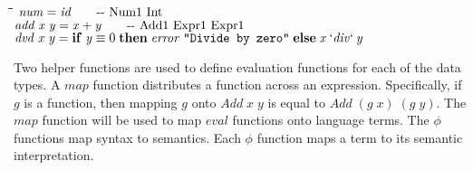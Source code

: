 \documentclass[10pt]{article}
\newlength{\lwidth}\setlength{\lwidth}{4.5cm}
\newlength{\cwidth}\setlength{\cwidth}{8mm} %
\newcommand{\Conid}[1]{\mathit{#1}}
\newcommand{\Varid}[1]{\mathit{#1}}
\begin{document}
\begin{tabbing}
\qquad\=\hspace{\lwidth}\=\hspace{\cwidth}\=\+\kill
${\Varid{num}\mathrel{=}\Varid{id}\mbox{\qquad-{}-  Num1 Int}}$\\
${\Varid{add}\;\Varid{x}\;\Varid{y}\mathrel{=}\Varid{x}\mathbin{+}\Varid{y}\mbox{\qquad-{}-  Add1 Expr1 Expr1}}$\\
${\Varid{dvd}\;\Varid{x}\;\Varid{y}\mathrel{=}\mathbf{if}\;\Varid{y}\equiv \mathrm{0}\;\mathbf{then}\;\Varid{error}\;\text{\tt \char34 Divide~by~zero\char34}\;\mathbf{else}\;\Varid{x}\mathbin{\Varid{`div`}}\Varid{y}}$
\end{tabbing}

Two helper functions are used to define evaluation functions for each
of the data types.  A \ensuremath{\Varid{map}} function distributes a function across an
expression.  Specifically, if \ensuremath{\Varid{g}} is a function, then mapping \ensuremath{\Varid{g}} onto
\ensuremath{\Conid{Add}\;\Varid{x}\;\Varid{y}} is equal to \ensuremath{\Conid{Add}\;(\Varid{g}\;\Varid{x})\;(\Varid{g}\;\Varid{y})}.  The \ensuremath{\Varid{map}} function will be
used to map \ensuremath{\Varid{eval}} functions onto language terms.  The \ensuremath{\Varid{\phi}} functions
map syntax to semantics.  Each \ensuremath{\Varid{\phi}} function maps a term to its
semantic interpretation.
\end{document}
